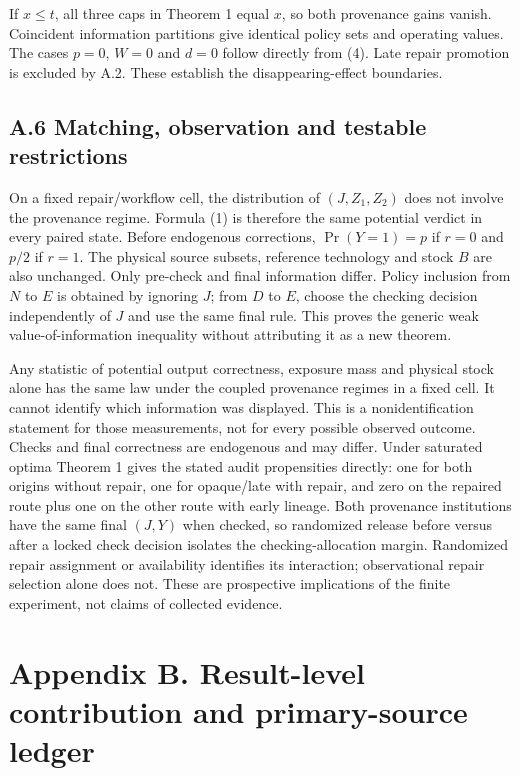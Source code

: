 \documentclass[
  11pt,
  a4paper,
]{article}
\begin{document}
If \(x\leq t\), all three caps in Theorem 1 equal \(x\), so both
provenance gains vanish. Coincident information partitions give
identical policy sets and operating values. The cases \(p=0\), \(W=0\)
and \(d=0\) follow directly from (4). Late repair promotion is excluded
by A.2. These establish the disappearing-effect boundaries.

\subsection{A.6 Matching, observation and testable
restrictions}\label{a.6-matching-observation-and-testable-restrictions}

On a fixed repair/workflow cell, the distribution of \((J,Z_1,Z_2)\)
does not involve the provenance regime. Formula (1) is therefore the
same potential verdict in every paired state. Before endogenous
corrections, \(\Pr(Y=1)=p\) if \(r=0\) and \(p/2\) if \(r=1\). The
physical source subsets, reference technology and stock \(B\) are also
unchanged. Only pre-check and final information differ. Policy inclusion
from \(N\) to \(E\) is obtained by ignoring \(J\); from \(D\) to \(E\),
choose the checking decision independently of \(J\) and use the same
final rule. This proves the generic weak value-of-information inequality
without attributing it as a new theorem.

Any statistic of potential output correctness, exposure mass and
physical stock alone has the same law under the coupled provenance
regimes in a fixed cell. It cannot identify which information was
displayed. This is a nonidentification statement for those measurements,
not for every possible observed outcome. Checks and final correctness
are endogenous and may differ. Under saturated optima Theorem 1 gives
the stated audit propensities directly: one for both origins without
repair, one for opaque/late with repair, and zero on the repaired route
plus one on the other route with early lineage. Both provenance
institutions have the same final \((J,Y)\) when checked, so randomized
release before versus after a locked check decision isolates the
checking-allocation margin. Randomized repair assignment or availability
identifies its interaction; observational repair selection alone does
not. These are prospective implications of the finite experiment, not
claims of collected evidence.

\section{Appendix B. Result-level contribution and primary-source
ledger}\label{appendix-b.-result-level-contribution-and-primary-source-ledger}
\end{document}
